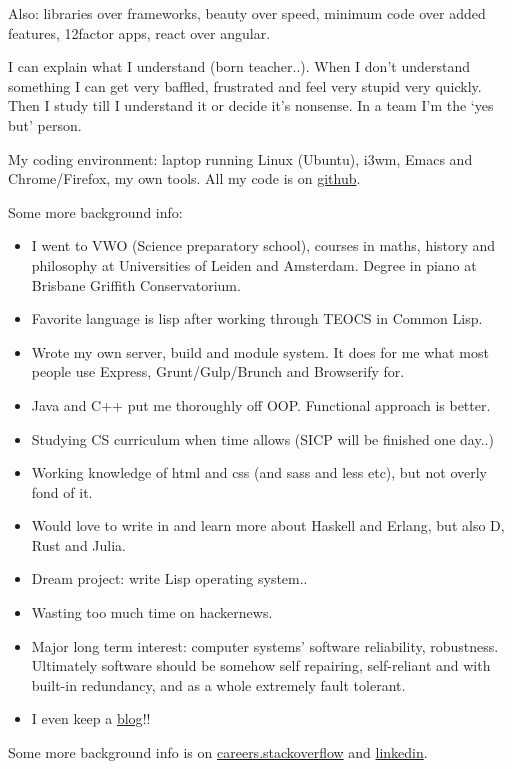 \documentclass[11pt]{article}
\begin{document}
Also: libraries over frameworks, beauty over speed, minimum code over added features, 12factor apps, react over angular.
 
I can explain what I understand (born teacher..). When I don't understand something I can get very baffled, frustrated and feel very stupid very quickly. Then I study till I understand it or decide it's nonsense. In a team I'm the `yes but' person. 
 
My coding environment: laptop running Linux (Ubuntu), i3wm, Emacs and Chrome/Firefox, my own tools. All my code is on \href{http://github.com/michieljoris}{github}.
 
Some more background info:
 
\begin{itemize}
\item I went to VWO (Science preparatory school), courses in maths, history and philosophy at Universities of Leiden and Amsterdam. Degree in piano at Brisbane Griffith Conservatorium.
\item Favorite language is lisp after working through TEOCS in Common Lisp.
\item Wrote my own server, build and module system. It does for me what most people use Express, Grunt/Gulp/Brunch and Browserify for.
\item Java and C++ put me thoroughly off OOP. Functional approach is better.
\item Studying CS curriculum when time allows (SICP will be finished one day..)
\item Working knowledge of html and css (and sass and less etc), but not overly fond of it.
\item Would love to write in and learn more about Haskell and Erlang, but also D, Rust and Julia.
\item Dream project: write Lisp operating system..
\item Wasting too much time on hackernews.
\item Major long term interest: computer systems' software reliability, robustness. Ultimately
  software should be somehow self repairing, self-reliant and with built-in
  redundancy, and as a whole extremely fault tolerant.
\item I even keep a \href{http://www.axion5.net}{blog}!!
\end{itemize}
 
Some more background info is on \href{http://careers.stackoverflow.com/michieljoris}{careers.stackoverflow} and \href{http://nl.linkedin.com/in/michieljoris/}{linkedin}.
\end{document}
